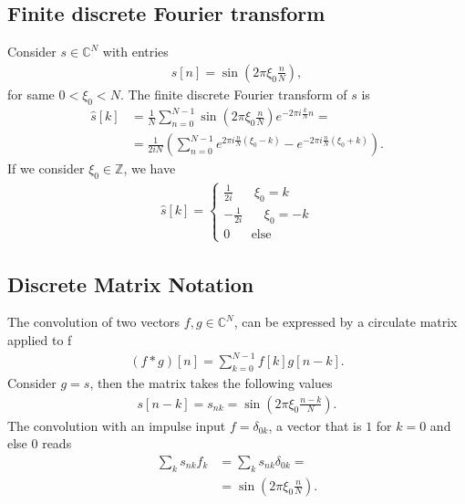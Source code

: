 \documentclass[a4paper]{article}
\begin{document}
\subsection{Finite discrete Fourier transform}
Consider $s\in \mathbb{C}^N$ with entries
\begin{align}
    s[n] = \sin\left(2\pi\xi_0\frac{n}{N}\right),
\end{align}
for same $0 < \xi_0 < N$. The finite discrete Fourier transform of $s$ is
\begin{align}
    \hat{s}[k] &= \frac{1}{N} \sum_{n=0}^{N-1} \sin\left(2\pi\xi_0\frac{n}{N}\right)
            e^{-2\pi i \frac{k}{N} n}  =\\
        &=\frac{1}{2iN}\left(
            \sum_{n=0}^{N-1}e^{2\pi i \frac{n}{N}(\xi_0 -k)} - e^{-2\pi i
            \frac{n}{N}(\xi_0 +k)}
            \right).
\end{align}
If we consider $\xi_0 \in \mathbb{Z}$, we have
\begin{align}
    \hat{s}[k] =
    \begin{cases}
        \frac{1}{2i}\;\;\;\;\;\; \xi_0 = k\\
        -\frac{1}{2i}\;\;\;\;\;\; \xi_0 = -k\\
        0   \;\;\;\;\;\; \text{else}
    \end{cases}
\end{align}
\subsection{Discrete Matrix Notation}
The convolution of two vectors $f, g \in \mathbb{C}^N$, can be expressed by a
circulate matrix applied to f
\begin{align}
    (f * g) [n] = \sum_{k=0}^{N-1} f[k] g[n-k].
\end{align}
Consider $g=s$, then the matrix takes the following values
\begin{align}
    s[n-k] = s_{nk} = \sin\left(2\pi \xi_0 \frac{n-k}{N}\right).
\end{align}
The convolution with an impulse input $f=\delta_{0k}$, a vector that is $1$
for $k=0$ and else 0 reads
\begin{align}
    \sum_k s_{nk}f_k &= \sum_k s_{nk} \delta_{0k} =\\
            &= \sin\left(2\pi \xi_0 \frac{n}{N}\right).
\end{align}

\end{document}

